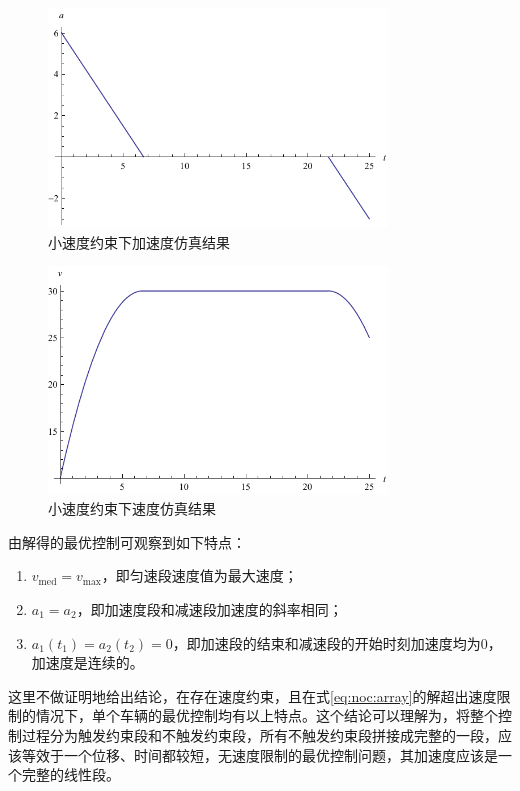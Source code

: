 \begin{figure}[htbp]
\centering
\includegraphics[width=9cm]{figures/vopt/sa.pdf}
\caption{小速度约束下加速度仿真结果}
\label{fig:sa}
\end{figure}
\begin{figure}[htbp]
\centering
\includegraphics[width=9cm]{figures/vopt/sv.pdf}
\caption{小速度约束下速度仿真结果}
\label{fig:sv}
\end{figure}

由解得的最优控制可观察到如下特点：
\begin{enumerate}[label=(\arabic*), wide=\parindent]
\item $v_\mathrm{med}=v_{\max}$，即匀速段速度值为最大速度；
\item $a_1=a_2$，即加速度段和减速段加速度的斜率相同；
\item $a_1(t_1)=a_2(t_2)=0$，即加速段的结束和减速段的开始时刻加速度均为0，加速度是连续的。
\end{enumerate}

这里不做证明地给出结论，在存在速度约束，且在式\eqref{eq:noc:array}的解超出速度限制的情况下，单个车辆的最优控制均有以上特点。这个结论可以理解为，将整个控制过程分为触发约束段和不触发约束段，所有不触发约束段拼接成完整的一段，应该等效于一个位移、时间都较短，无速度限制的最优控制问题，其加速度应该是一个完整的线性段。


